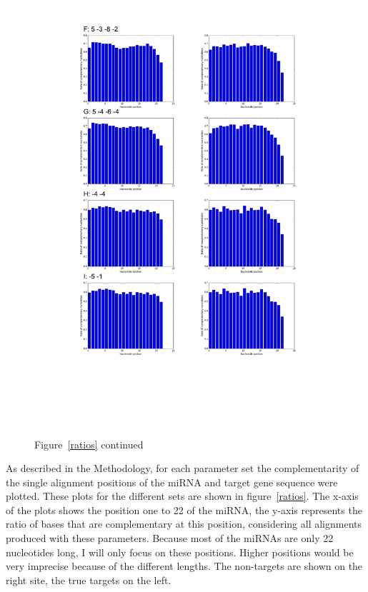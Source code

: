 \documentclass[11pt, a4paper, oneside]{book}
\begin{document}
\begin{figure}
\hspace{-1.2cm}
\includegraphics[scale=0.72]{results/compl2.pdf}
\vspace{-4cm}
\caption*{Figure~\ref{ratios} continued}
\end{figure}


As described in the Methodology, for each parameter set the complementarity of the single alignment positions of the miRNA and target gene sequence were plotted. These plots for the different sets are shown in figure~\ref{ratios}. The x-axis of the plots shows the position one to 22 of the miRNA, the y-axis represents the ratio of bases that are complementary at this position, considering all alignments produced with these parameters. Because most of the miRNAs are only 22 nucleotides long, I will only focus on these positions. Higher positions would be very imprecise because of the different lengths. The non-targets are shown on the right site, the true targets on the left.\\\\
\end{document}
